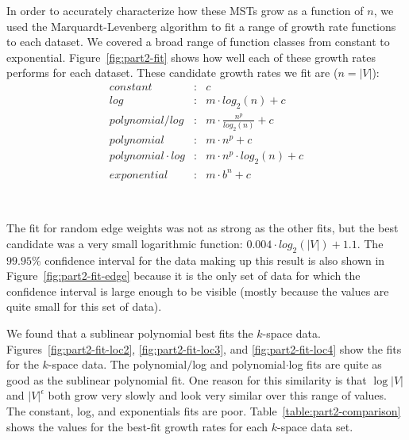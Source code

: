 In order to accurately characterize how these MSTs grow as a function of $n$, we
used the Marquardt-Levenberg algorithm to fit a range of growth rate functions
to each dataset.  We covered a broad range of function classes from constant to
exponential.  Figure~\ref{fig:part2-fit} shows how well each of these growth
rates performs for each dataset.  These candidate growth rates we fit are ($n =
|V|$):
\begin{eqnarray*}
constant&:& c \\
log&:& m \cdot log_2(n) + c \\
polynomial / log&:& m \cdot \frac{n^p}{log_2(n)} + c \\
polynomial&:& m \cdot n^p + c \\
polynomial \cdot log&:& m \cdot n^p \cdot log_2(n) + c \\
exponential&:& m \cdot b^n + c
\end{eqnarray*}

\begin{figure*}[htb!]
\centering
\mbox{
\quad
{}
}
\mbox{
\quad
{}
}
\caption{Comparison of best-fit lines to empirical data.}
\label{fig:part2-fit}
\end{figure*}

The fit for random edge weights was not as strong as the other fits, but the
best candidate was a very small logarithmic function: $0.004 \cdot log_2(|V|) +
1.1$.  The $99.95\%$ confidence interval for the data making up this result is
also shown in Figure~\ref{fig:part2-fit-edge} because it is the only set of data
for which the confidence interval is large enough to be visible (mostly because
the values are quite small for this set of data).

We found that a sublinear polynomial best fits the $k$-space data.
Figures~\ref{fig:part2-fit-loc2}, \ref{fig:part2-fit-loc3}, and
\ref{fig:part2-fit-loc4} show the fits for the $k$-space data.  The
polynomial$/$log and polynomial$\cdot$log fits are quite as good as the
sublinear polynomial fit. One reason for this similarity is that $\log |V|$
and $|V|^\epsilon$ both grow very slowly and look very similar over this range
of values. The constant, log, and exponentials fits are poor.
Table~\ref{table:part2-comparison} shows the values for the best-fit growth
rates for each $k$-space data set.


